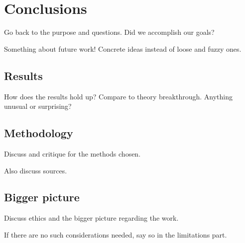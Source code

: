 \chapter{Conclusions}\label{cha:conclusions}

Go back to the purpose and questions. Did we accomplish our goals?

Something about future work! Concrete ideas instead of loose and fuzzy ones.


\section{Results}\label{sec:conclusions:results}

How does the results hold up? Compare to theory breakthrough. Anything unusual or surprising?


\section{Methodology}\label{sec:conclusions:method}

Discuss and critique for the methods chosen.

Also discuss sources.


\section{Bigger picture}\label{sec:conclusions:big}

Discuss ethics and the bigger picture regarding the work.

If there are no such considerations needed, say so in the limitations part.

